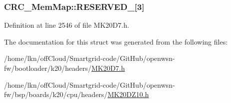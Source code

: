 \subsubsection[{\texorpdfstring{R\+E\+S\+E\+R\+V\+E\+D\+\_\+0}{RESERVED_0}}]{ C\+R\+C\+\_\+\+Mem\+Map\+::\+R\+E\+S\+E\+R\+V\+E\+D\+\_\mbox{[}3\mbox{]}}\hypertarget{struct_c_r_c___mem_map_aa3fff9f81f6433f652e1329cbf631a9c}{}\label{struct_c_r_c___mem_map_aa3fff9f81f6433f652e1329cbf631a9c}


Definition at line 2546 of file M\+K20\+D7.\+h.



The documentation for this struct was generated from the following files\+:\begin{DoxyCompactItemize}
\item 
/home/lkn/off\+Cloud/\+Smartgrid-\/code/\+Git\+Hub/openwsn-\/fw/bootloader/k20/headers/\hyperlink{bootloader_2k20_2headers_2_m_k20_d7_8h}{M\+K20\+D7.\+h}\item 
/home/lkn/off\+Cloud/\+Smartgrid-\/code/\+Git\+Hub/openwsn-\/fw/bsp/boards/k20/cpu/headers/\hyperlink{_m_k20_d_z10_8h}{M\+K20\+D\+Z10.\+h}\end{DoxyCompactItemize}

